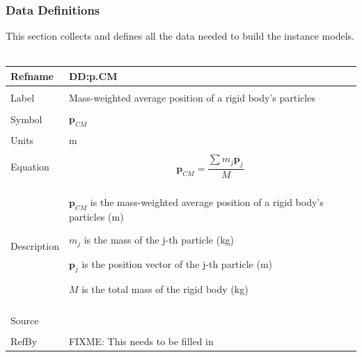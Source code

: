 \documentclass[12pt]{article}
\begin{document}
\subsubsection{Data Definitions}
\label{Sec:DDs}
This section collects and defines all the data needed to build the instance models.
~\newline
\noindent \begin{minipage}{\textwidth}
\begin{tabular}{p{} p{}}
\toprule \textbf{Refname} & \textbf{DD:p.CM}
\label{DD:p.CM}
\\ \midrule \\
Label & Mass-weighted average position of a rigid body's particles
\\ \midrule \\
Symbol & ${\mathbf{p}_{CM}}$
\\ \midrule \\
Units & m
\\ \midrule \\
Equation & \begin{dmath}
           {\mathbf{p}_{CM}}=\frac{\displaystyle\sum{{m_{j}} {\mathbf{p}_{j}}}}{M}
           \end{dmath}
\\ \midrule \\
Description & \begin{symbDescription}
              \item{${\mathbf{p}_{CM}}$ is the mass-weighted average position of a rigid body's particles (m)}
              \item{${m_{j}}$ is the mass of the j-th particle (kg)}
              \item{${\mathbf{p}_{j}}$ is the position vector of the j-th particle (m)}
              \item{$M$ is the total mass of the rigid body (kg)}
              \end{symbDescription}
\\ \midrule \\
Source & 
\\ \midrule \\
RefBy & FIXME: This needs to be filled in
\\ \bottomrule \end{tabular}
\end{minipage}\\
~\newline
\end{document}
